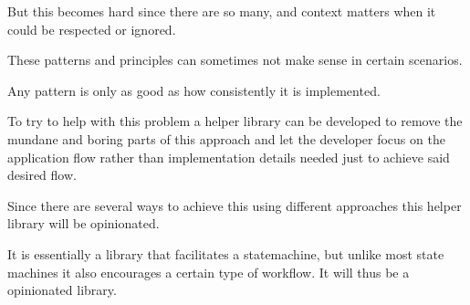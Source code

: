 But this becomes hard since there are so many, and context matters when it could be respected or ignored.

These patterns and principles can sometimes not make sense in certain scenarios.

Any pattern is only as good as how consistently it is implemented. 

To try to help with this problem a helper library can be developed to remove the mundane
and boring parts of this approach and let the developer focus on the application flow rather
than implementation details needed just to achieve said desired flow.

Since there are several ways to achieve this using different approaches this helper
library will be opinionated.

It is essentially a library that facilitates a statemachine, but unlike most
state machines it also encourages a certain type of workflow. It will thus be a opinionated
library.